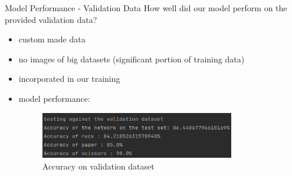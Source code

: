 \documentclass[aspectratio=169]{beamer}
\begin{document}
{	\begin{frame}{Model Performance - Validation Data}
		How well did our model perform on the provided validation data?
		\begin{itemize}
			\item custom made data
			\item no images of big datasets (significant portion of training data)
			\item incorporated in our training
			\pause
			\item model performance:
			\newline
			\begin{figure}
				\centering
				\includegraphics[width=0.8\textwidth]{img/TestAccuracy_final_validation.png}
				\caption{Accuracy on validation dataset}
			\end{figure}   
		\end{itemize}
	\end{frame}

}
\end{document}
